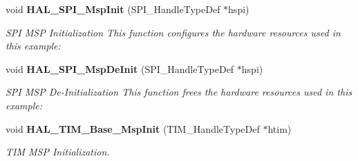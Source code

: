 \begin{DoxyCompactItemize}
void \textbf{ H\+A\+L\+\_\+\+S\+P\+I\+\_\+\+Msp\+Init} (S\+P\+I\+\_\+\+Handle\+Type\+Def $\ast$hspi)
\begin{DoxyCompactList}\small\item\em S\+PI M\+SP Initialization This function configures the hardware resources used in this example\+: \end{DoxyCompactList}\item 
void \textbf{ H\+A\+L\+\_\+\+S\+P\+I\+\_\+\+Msp\+De\+Init} (S\+P\+I\+\_\+\+Handle\+Type\+Def $\ast$hspi)
\begin{DoxyCompactList}\small\item\em S\+PI M\+SP De-\/\+Initialization This function frees the hardware resources used in this example\+: \end{DoxyCompactList}\item 
void \textbf{ H\+A\+L\+\_\+\+T\+I\+M\+\_\+\+Base\+\_\+\+Msp\+Init} (T\+I\+M\+\_\+\+Handle\+Type\+Def $\ast$htim)
\begin{DoxyCompactList}\small\item\em T\+IM M\+SP Initialization. \end{DoxyCompactList}\end{DoxyCompactItemize}
